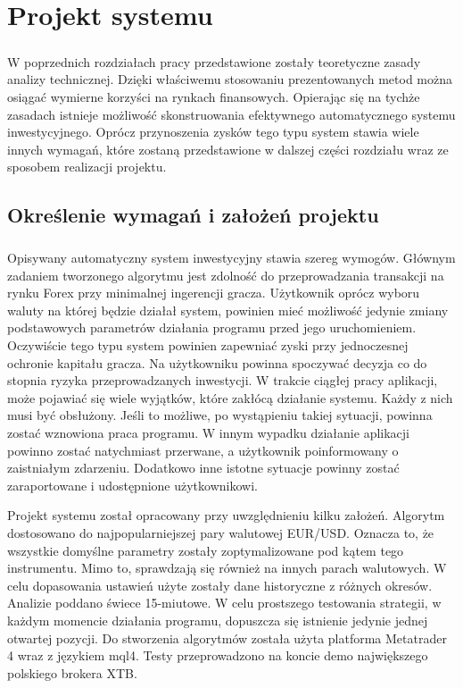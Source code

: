 \documentclass[pdflatex,11pt]{aghdpl}
\begin{document}
\chapter{Projekt systemu}
\label{chap:projekt}
\paragraph{}
W poprzednich rozdziałach pracy przedstawione zostały teoretyczne zasady analizy technicznej. Dzięki właściwemu stosowaniu prezentowanych metod można osiągać wymierne korzyści na rynkach finansowych. Opierając się na tychże zasadach istnieje możliwość skonstruowania efektywnego automatycznego systemu inwestycyjnego. Oprócz przynoszenia zysków tego typu system stawia wiele innych wymagań, które zostaną przedstawione w dalszej części rozdziału wraz ze sposobem realizacji projektu.

\section{Określenie wymagań i założeń projektu}
\paragraph{}

Opisywany automatyczny system inwestycyjny stawia szereg wymogów. Głównym zadaniem tworzonego algorytmu jest zdolność do przeprowadzania transakcji na rynku Forex przy minimalnej ingerencji gracza. Użytkownik oprócz wyboru waluty na której będzie działał system, powinien mieć możliwość jedynie zmiany podstawowych parametrów działania programu przed jego uruchomieniem. Oczywiście tego typu system powinien zapewniać zyski przy jednoczesnej ochronie kapitału gracza. Na użytkowniku powinna spoczywać decyzja co do stopnia ryzyka przeprowadzanych inwestycji. W trakcie ciągłej pracy aplikacji, może pojawiać się wiele wyjątków, które zakłócą działanie systemu. Każdy z nich musi być obsłużony. Jeśli to możliwe, po wystąpieniu takiej sytuacji, powinna zostać wznowiona praca programu. W innym wypadku działanie aplikacji powinno zostać natychmiast przerwane, a użytkownik poinformowany o zaistniałym zdarzeniu. Dodatkowo inne istotne sytuacje powinny zostać zaraportowane i udostępnione użytkownikowi.  

Projekt systemu został opracowany przy uwzględnieniu kilku założeń. Algorytm dostosowano do najpopularniejszej pary walutowej EUR/USD. Oznacza to, że wszystkie domyślne parametry zostały zoptymalizowane pod kątem tego instrumentu. Mimo to, sprawdzają się również na innych parach walutowych. W celu dopasowania ustawień użyte zostały dane historyczne z różnych okresów. Analizie poddano świece 15-miutowe. W celu prostszego testowania strategii, w każdym momencie działania programu, dopuszcza się istnienie jedynie jednej otwartej pozycji. Do stworzenia algorytmów została użyta platforma Metatrader 4 wraz z językiem mql4. Testy przeprowadzono na koncie demo największego polskiego brokera XTB. 
\end{document}
